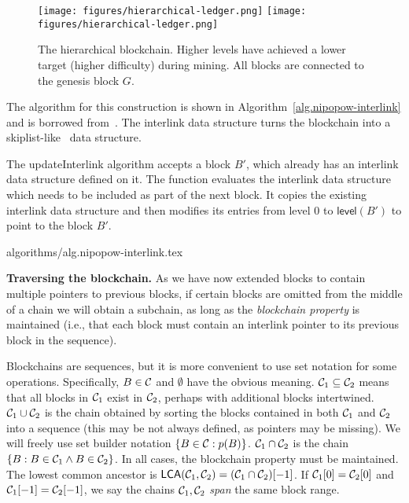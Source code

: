 \begin{figure}
    \caption{The hierarchical blockchain.
    Higher levels have achieved a lower target (higher difficulty) during
    mining. All blocks are connected to the genesis block $G$.}
    \centering
    \iftwocolumn
        \texttt{[image: figures/hierarchical-ledger.png]}
    \else
        \texttt{[image: figures/hierarchical-ledger.png]}
    \fi
    \label{fig.hierarchy}
\end{figure}

The algorithm for this construction is shown in
Algorithm~\ref{alg.nipopow-interlink} and is borrowed from~\cite{KLS}. The
interlink data structure turns the blockchain into a
skiplist-like~\cite{skiplist} data structure.

The updateInterlink algorithm accepts a block $B'$, which already has an
interlink data structure defined on it. The function evaluates the
interlink data structure which needs to be included as part of the next block.
It copies the existing interlink data structure and
then modifies its entries from level $0$ to $\textsf{level}(B')$ to
point to the block $B'$.

{algorithms/alg.nipopow-interlink.tex}

\noindent\textbf{Traversing the blockchain. }
As we have now extended blocks to contain multiple pointers to previous blocks,
if certain blocks are omitted from the middle of a chain we will obtain a
subchain, as long as the \emph{blockchain property} is maintained (i.e., that
each block must contain an interlink pointer to its previous block in the
sequence).

Blockchains are sequences, but it is more convenient to use set notation for
some operations. Specifically, $B \in \mathcal{C}$ and $\emptyset$ have the obvious
meaning. $\mathcal{C}_1 \subseteq \mathcal{C}_2$ means that all blocks in $\mathcal{C}_1$ exist
in $\mathcal{C}_2$, perhaps with additional blocks intertwined. $\mathcal{C}_1 \cup
\mathcal{C}_2$ is the chain obtained by sorting the blocks contained in both
$\mathcal{C}_1$ and $\mathcal{C}_2$ into a sequence (this may be not always defined, as
pointers may be missing). We will freely use set builder notation $\{B \in
\mathcal{C}: p(B)\}$. $\mathcal{C}_1 \cap \mathcal{C}_2$ is the chain $\{B: B \in \mathcal{C}_1
\land B \in \mathcal{C}_2\}$. In all cases, the blockchain property must be
maintained. The lowest common ancestor is $\textsf{LCA}(\mathcal{C}_1, \mathcal{C}_2) =
(\mathcal{C}_1 \cap \mathcal{C}_2)[-1]$. If $\mathcal{C}_1[0] = \mathcal{C}_2[0]$ and $\mathcal{C}_1[-1]
= \mathcal{C}_2[-1]$, we say the chains $\mathcal{C}_1, \mathcal{C}_2$ \emph{span} the same
block range.

